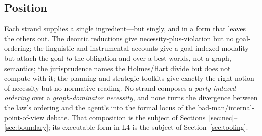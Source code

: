 \subsection{Position}
Each strand supplies a single ingredient---but singly, and in a form that leaves the
others out. The deontic reductions give necessity-plus-violation but no goal-ordering; the
linguistic and instrumental accounts give a goal-indexed modality but attach the goal
\emph{to} the obligation and over a best-worlds, not a graph, semantics; the jurisprudence
names the Holmes/Hart divide but does not compute with it; the planning and strategic
toolkits give exactly the right notion of necessity but no normative reading. No strand
composes a \emph{party-indexed ordering} over a \emph{graph-dominator necessity}, and none
turns the divergence between the law's ordering and the agent's into the formal locus of
the bad-man/internal-point-of-view debate. That composition is the subject of
Sections~\ref{sec:nec}--\ref{sec:boundary}; its executable form in L4 is the subject of
Section~\ref{sec:tooling}.
